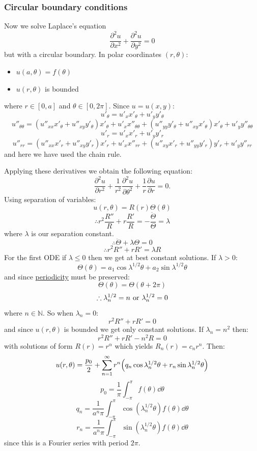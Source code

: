 \documentclass{article}
\begin{document}
\subsubsection{Circular boundary conditions}
Now we solve Laplace's equation
$$\frac{\partial^2 u}{\partial x^2}+\frac{\partial^2 u}{\partial y^2}=0$$
but with a circular boundary. In polar coordinates $(r,\theta)$:
\begin{itemize}
    \item $u(a,\theta)=f(\theta)$
    \item $u(r,\theta)$ is bounded
\end{itemize}
where $r\in[0,a]$ and $\theta\in[0,2\pi]$. Since $u=u(x,y)$:
$$u'_{\theta}=u'_x x'_{\theta}+u'_y y'_{\theta}$$
$$u''_{\theta\theta}=(u''_{xx}x'_{\theta}+u''_{xy}y'_{\theta})x'_{\theta}
+u'_x x''_{\theta\theta}+(u''_{yy}y'_{\theta}+u''_{xy}x'_{\theta})x'_{\theta}+u'_y y''_{\theta\theta}$$
$$u'_r=u'_x x'_r+u'_y y'_r$$
$$u''_{rr}=(u''_{xx}x'_r+u''_{xy}y'_r)x'_r
+u'_x x''_{rr}+(u''_{xy}x'_r+u''_{yy}y'_r)y'_r+u'_y y''_{rr}$$
and here we have used the chain rule.

\newpage

Applying these derivatives we obtain the following equation:
$$\frac{\partial^2 u}{\partial r^2}+\frac{1}{r^2}\frac{\partial^2 u}{\partial\theta^2}
+\frac{1}{r}\frac{\partial u}{\partial r}=0.$$
Using separation of variables:
$$u(r,\theta)=R(r)\Theta(\theta)$$
$$\therefore r^2\frac{R''}{R}+r\frac{R'}{R}=-\frac{\ddot{\Theta}}{\Theta}=\lambda$$
where $\lambda$ is our separation constant.
$$\therefore\ddot{\Theta}+\lambda\Theta=0$$
$$\therefore r^2 R''+rR'=\lambda R$$
For the first ODE if $\lambda\leq0$ then we get
at best constant solutions. If $\lambda>0$:
$$\Theta(\theta)=a_1\cos\lambda^{1/2}\theta
+a_2\sin\lambda^{1/2}\theta$$
and since \underline{periodicity} must be preserved:
$$\Theta(\theta)=\Theta(\theta+2\pi)$$
$$\therefore\lambda_n^{1/2}=n
\hspace{0.05in}\text{or}\hspace{0.05in}
\lambda_n^{1/2}=0$$
where $n\in\mathbb{N}$. So when $\lambda_n=0$:
$$r^2 R''+rR'=0$$
and since $u(r,\theta)$ is bounded we get only constant solutions.
If $\lambda_n=n^2$ then:
$$r^2 R''+rR'-n^2 R=0$$
with solutions of form $R(r)=r^{\alpha}$ which yields
$R_n(r)=c_n r^n$. Then:
$$u(r,\theta)=\frac{p_0}{2}+\sum_{n=1}^{\infty}
r^n\Bigl(q_n\cos\lambda_n^{1/2}\theta
+r_n\sin\lambda_n^{1/2}\theta\Bigr)$$
$$p_0=\frac{1}{\pi}\int_{-\pi}^{\pi}f(\theta)\dd\theta$$
$$q_n=\frac{1}{a^n\pi}\int_{-\pi}^{\pi}
\cos(\lambda_n^{1/2}\theta)f(\theta)\dd\theta$$
$$r_n=\frac{1}{a^n\pi}\int_{-\pi}^{\pi}
\sin(\lambda_n^{1/2}\theta)f(\theta)\dd\theta$$
since this is a Fourier series with period $2\pi$.
\end{document}
